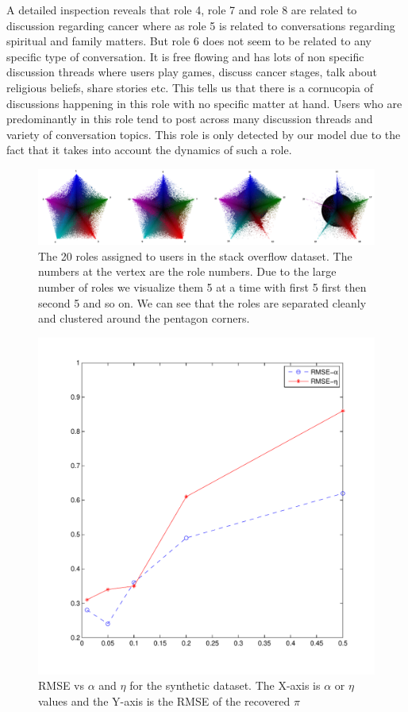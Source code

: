 \documentclass{sig-alternate}
\newcommand{\abhi}[1]{\textcolor{blue}{\\ abhi-comment: #1}}
\begin{document}
A detailed inspection reveals that role 4, role 7 and role 8 are
related to discussion regarding cancer where as role 5 is related to
conversations regarding spiritual and family matters.  But role 6 does not seem
to be related to any specific type of conversation. It is free flowing and has
lots of non specific discussion threads where users play games,
discuss cancer stages, talk about religious beliefs, share stories etc. 
This tells us that there is a cornucopia of
discussions happening in this role with no specific matter at hand. 
Users who are
predominantly in this role tend to post across many discussion threads and
variety of conversation topics. This role is only detected by our model due to the
fact that it takes into account the dynamics of such a role.

\begin{figure}
\centering
  \includegraphics[width=1\linewidth]{piSOAnnotated.png}
\caption{\small{The 20 roles assigned to users in the stack overflow
dataset. The numbers at the vertex are the role numbers. Due to the large
number of roles we visualize them 5 at a time with first 5 first then second
5 and so on.
We can see that the roles are separated cleanly and clustered around the
pentagon corners.}}
\label{fig:SOclusters}
\end{figure}

\begin{figure}
\centering
  \includegraphics[width=0.7\linewidth]{synth.pdf}
\caption{\small{RMSE vs $\alpha$ and $\eta$ for the synthetic dataset. The X-axis is
$\alpha$ or $\eta$ values and the Y-axis is the RMSE of the recovered $\pi$}}
\label{fig:syntheticRMSE}
\end{figure}
 
\end{document}
